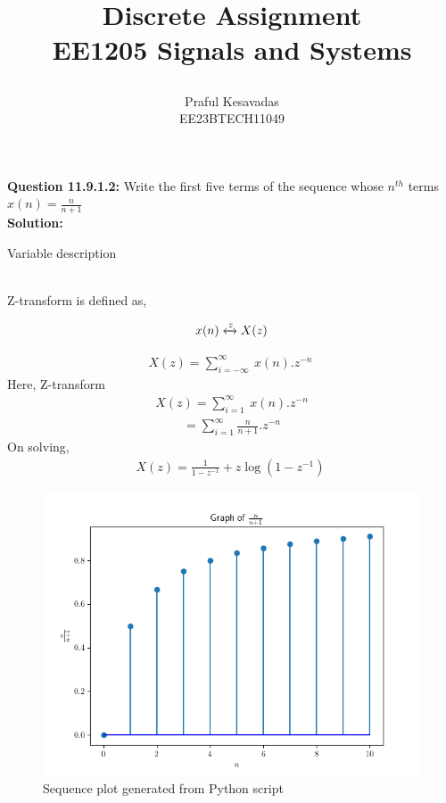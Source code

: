 \documentclass{article}
\begin{document}
\title{
\Huge\textbf{Discrete Assignment}\\
\Huge\textbf{EE1205} Signals and Systems\\
\date{}
}
\large\author{Praful Kesavadas\\EE23BTECH11049}
\maketitle

\textbf{Question 11.9.1.2:}
Write the first five terms of the sequence whose $n^{th}$ terms  $x(n) = \frac{n}{n+1}$\\
\textbf{Solution:}
\begin{table}[ht]
    \centering
    
    \caption{Variable description}
    \label{tab:11.9.1.2.1}
\end{table}\\
Z-transform is defined as, 

$$ x(n) \xleftrightarrow z  X(z)$$

\begin{align}
X(z) =  \sum_{i=-\infty}^\infty\ x(n).z^{-n}\
\end{align}
Here, Z-transform
\begin{align}
X(z) = \sum_{i=1}^\infty\ x(n).z^{-n}
\end{align}
\begin{align}
= \sum_{i=1}^\infty \frac{n}{n+1} . z^{-n}
\end{align}
On solving, 
\begin{align}
X(z) = \frac{1}{1-z^{-1}} + z\log{(1-z^{-1})}\
\end{align}
\begin{figure}[h]
    \centering
    \includegraphics[width=0.7\linewidth]{figs/graph.png}
    \caption{Sequence plot generated from Python script}
    \label{fig:sequence-plot}
\end{figure}
\end{document}
